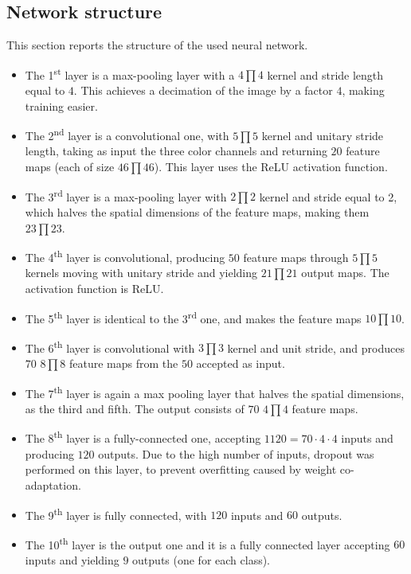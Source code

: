 \documentclass[12pt]{article}
\begin{document}
\subsection{Network structure}

This section reports the structure of the used neural network.

\begin{itemize}
  \item The 1\textsuperscript{st} layer is a max-pooling layer with a $4 \prod 4$ kernel and stride length equal to $4$. This achieves a decimation of the image by a factor $4$, making training easier.
  \item The 2\textsuperscript{nd} layer is a convolutional one, with $5 \prod 5$ kernel and unitary stride length, taking as input the three color channels and returning $20$ feature maps (each of size $46 \prod 46$). This layer uses the ReLU activation function.
  \item The 3\textsuperscript{rd} layer is a max-pooling layer with $2 \prod 2$ kernel and stride equal to 2, which halves the spatial dimensions of the feature maps, making them $23 \prod 23$.
  \item The 4\textsuperscript{th} layer is convolutional, producing $50$ feature maps through $5 \prod 5$ kernels moving with unitary stride and yielding $21 \prod 21$ output maps. The activation function is ReLU\@.
  \item The 5\textsuperscript{th} layer is identical to the 3\textsuperscript{rd} one, and makes the feature maps $10 \prod 10$.
  \item The 6\textsuperscript{th} layer is convolutional with $3 \prod 3$ kernel and unit stride, and produces $70$ $8 \prod 8$ feature maps from the $50$ accepted as input.
  \item The 7\textsuperscript{th} layer is again a max pooling layer that halves the spatial dimensions, as the third and fifth. The output consists of $70$ $4 \prod 4$ feature maps.
  \item The 8\textsuperscript{th} layer is a fully-connected one, accepting $1120 = 70 \cdot 4 \cdot 4$ inputs and producing $120$ outputs. Due to the high number of inputs, dropout was performed on this layer, to prevent overfitting caused by weight co-adaptation.
  \item The 9\textsuperscript{th} layer is fully connected, with $120$ inputs and $60$ outputs.
  \item The 10\textsuperscript{th} layer is the output one and it is a fully connected layer accepting $60$ inputs and yielding $9$ outputs (one for each class).
\end{itemize}
\end{document}
